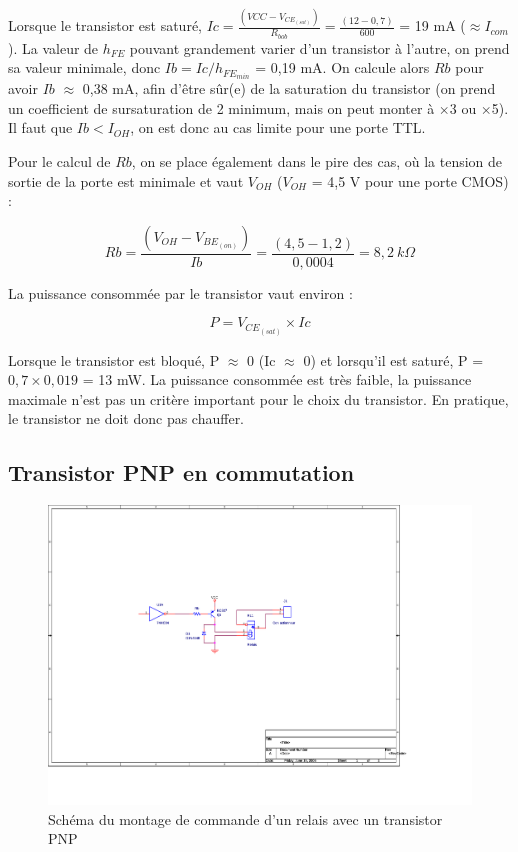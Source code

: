 \documentclass[a4paper]{article}
\begin{document}
Lorsque le transistor est saturé, $Ic = \frac{(VCC - V_{CE_{(sat)}})}{R_{bob}} = \frac{(12 - 0,7)}{600}$ = 19 mA ($\approx{} I_{com}$). La valeur de $h_{FE}$ pouvant grandement varier d'un transistor à l'autre, on prend sa valeur minimale, donc $Ib = Ic/h_{FE_{min}}$ = 0,19 mA. On calcule alors $Rb$ pour avoir $Ib$ $\approx$ 0,38 mA, afin d'être sûr(e) de la saturation du transistor (on prend un coefficient de sursaturation de 2 minimum, mais on peut monter à $\times$3 ou $\times$5). Il faut que $Ib < I_{OH}$, on est donc au cas limite pour une porte \ac{TTL}.

Pour le calcul de $Rb$, on se place également dans le pire des cas, où la tension de sortie de la porte est minimale et vaut $V_{OH}$ ($V_{OH}$ = 4,5 V pour une porte \ac{CMOS}) :

\[Rb = \frac{(V_{OH} - V_{BE_{(on)}})}{Ib} = \frac{(4,5 - 1,2)}{0,0004} = 8,2\ k\Omega\]

La puissance consommée par le transistor vaut environ :

\[P = V_{CE_{(sat)}}\times{}Ic\]

Lorsque le transistor est bloqué, P $\approx$ 0 (Ic $\approx$ 0) et lorsqu'il est saturé, P = $0,7\times{}0,019$ = 13 mW. La puissance consommée est très faible, la puissance maximale n'est pas un critère important pour le choix du transistor. En pratique, le transistor ne doit donc pas chauffer.

\subsection{Transistor PNP en commutation}

\begin{figure}[H]
	\centering
	\includegraphics[scale=1.00]{Images/Montage_commande_relais_PNP}
	\caption{Schéma du montage de commande d'un relais avec un transistor PNP
		\label{Montage_commande_relais_PNP}}
\end{figure}
\end{document}
